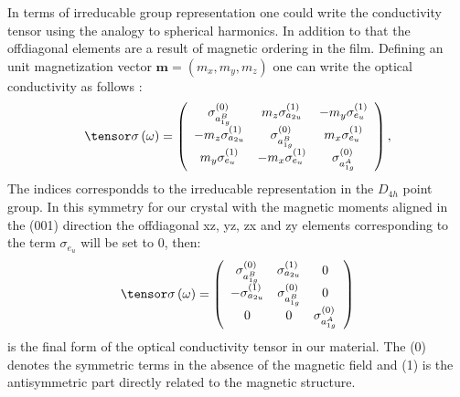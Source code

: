\documentclass[twocolumn,amsmath,superscriptaddress,amssymb]{revtex4-1}
\let\vec\mathbf
\begin{document}
%
In terms of irreducable group representation \cite{Griffith} one could write the conductivity tensor using the analogy to spherical harmonics. In addition to that the offdiagonal elements are a result of magnetic ordering in the film. Defining an unit magnetization vector $\vec{m}=(m_x,m_y,m_z)$ one can write the optical conductivity as follows \cite{Haverkort}:
\begin{equation}\label{eq:OptCond}
\tensor \sigma\left(\omega\right) = \left(
\begin{array}{ccc}
\sigma_{a_{1g}^B}^{(0)}&m_z\sigma_{a_{2u}}^{(1)}&-m_y\sigma_{e_u}^{(1)} \\
-m_z\sigma_{a_{2u}}^{(1)}&\sigma_{a_{1g}^B}^{(0)}&m_x\sigma_{e_u}^{(1)} \\
m_y\sigma_{e_u}^{(1)} &-m_x\sigma_{e_u}^{(1)} &\sigma_{a_{1g}^A}^{(0)}
\end{array} \right),
\end{equation}
%
The indices correspondds to the irreducable representation in the $D_{4h}$ point group. In this symmetry for our crystal with the magnetic moments aligned in the (001) direction the offdiagonal xz, yz, zx and zy elements corresponding to the term $\sigma_{e_u}$ will be set to 0, then:
\begin{equation}
\tensor \sigma\left(\omega\right) = \left(
\begin{array}{ccc}
\sigma_{a_{1g}^B}^{(0)}&\sigma_{a_{2u}}^{(1)}&0 \\
-\sigma_{a_{2u}}^{(1)}&\sigma_{a_{1g}^B}^{(0)}&0 \\
0&0&\sigma_{a_{1g}^A}^{(0)}
\end{array} \right)
\end{equation}
%
\noindent is the final form of the optical conductivity tensor in our material. The (0) denotes the symmetric terms in the absence of the magnetic field and (1) is the antisymmetric part directly related to the magnetic structure.

\end{document}

